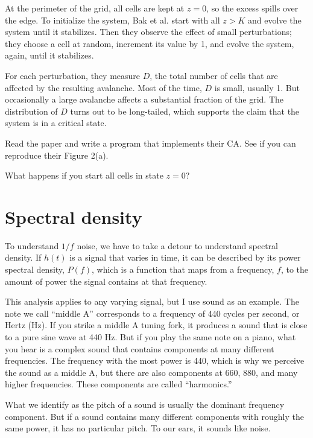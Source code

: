 \documentclass[10pt]{book}
\begin{document}
At the perimeter of the grid, all cells are kept at $z=0$, so
the excess spills over the edge.  To initialize the system,
Bak et al. start with all $z > K$ and evolve the system until
it stabilizes.  Then they observe the effect of small perturbations;
they choose a cell at random, increment its value
by 1, and evolve the system, again, until it stabilizes.

For each perturbation, they measure $D$, the total number
of cells that are affected by the resulting avalanche.  Most of
the time, $D$ is small, usually 1.  But occasionally
a large avalanche affects a substantial fraction
of the grid.  The distribution of $D$ turns out to be long-tailed,
which supports the claim that the system is in a critical state.

\begin{ex}

Read the paper and write a program that implements their CA.
See if you can reproduce their Figure 2(a).

What happens if you start all cells in state $z=0$?

\end{ex}


\section{Spectral density}

To understand $1/f$ noise, we have to take a detour to understand
spectral density.  If $h(t)$ is a signal that varies in time, it can
be described by its power spectral density, $P(f)$, which is a
function that maps from a frequency, $f$, to the amount of power the
signal contains at that frequency.

This analysis applies to any varying signal, but I use sound as
an example.  The note we call ``middle A'' corresponds to a frequency
of 440 cycles per second, or Hertz (Hz).  If you strike a middle A
tuning fork, it produces a sound that is close to a pure sine wave at
440 Hz.  But if you play the same note on a piano, what you hear is
a complex sound that contains components at many different
frequencies.  The frequency with the most power is 440, which is why
we perceive the sound as a middle A, but there are also components at
660, 880, and many higher frequencies.  These components are called
``harmonics.''

What we identify as the pitch of a sound is usually the dominant
frequency component.  But if a sound contains many different
components with roughly the same power, it has no particular pitch.
To our ears, it sounds like noise.
\end{document}
